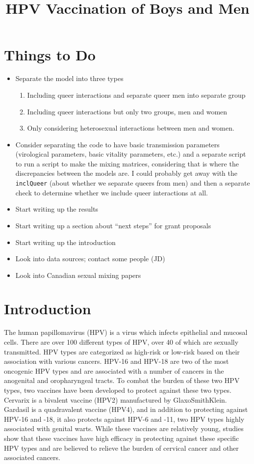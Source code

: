 \documentclass[12pt]{article}
\title{HPV Vaccination of Boys and Men}
\begin{document}
\maketitle

\section*{Things to Do}
\begin{itemize}
\item Separate the model into three types
	\begin{enumerate}
	\item Including queer interactions and separate queer men into separate group
	\item Including queer interactions but only two groups, men and women
	\item Only considering heterosexual interactions between men and women. 
	\end{enumerate}
\item Consider separating the code to have basic transmission parameters (virological parameters, basic vitality parameters, etc.) and a separate script to run a script to make the mixing matrices, considering that is where the discrepancies between the models are. 
I could probably get away with the \texttt{inclQueer} (about whether we separate queers from men) and then a separate check to determine whether we include queer interactions at all.  
\item Start writing up the results
\item Start writing up a section about ``next steps'' for grant proposals
\item Start writing up the introduction
\item Look into data sources; contact some people (JD)
\item Look into Canadian sexual mixing papers
\end{itemize}

\section{Introduction}

The human papillomavirus (HPV) is a virus which infects epithelial and mucosal cells.  There are over 100 different types of HPV, over 40 of which are sexually transmitted.  HPV types are categorized as high-risk or low-risk based on their association with various cancers.  HPV-16 and HPV-18 are two of the most oncogenic HPV types and are associated with a number of cancers in the anogenital and oropharyngeal tracts.  To combat the burden of these two HPV types, two vaccines have been developed to protect against these two types.  Cervarix is a bivalent vaccine (HPV2) manufactured by GlaxoSmithKlein.  Gardasil is a quadravalent vaccine (HPV4), and in addition to protecting against HPV-16 and -18, it also protects against HPV-6 and -11, two HPV types highly associated with genital warts.  While these vaccines are relatively young, studies show that these vaccines have high efficacy in protecting against these specific HPV types and are believed to relieve the burden of cervical cancer and other associated cancers.  
\end{document}
